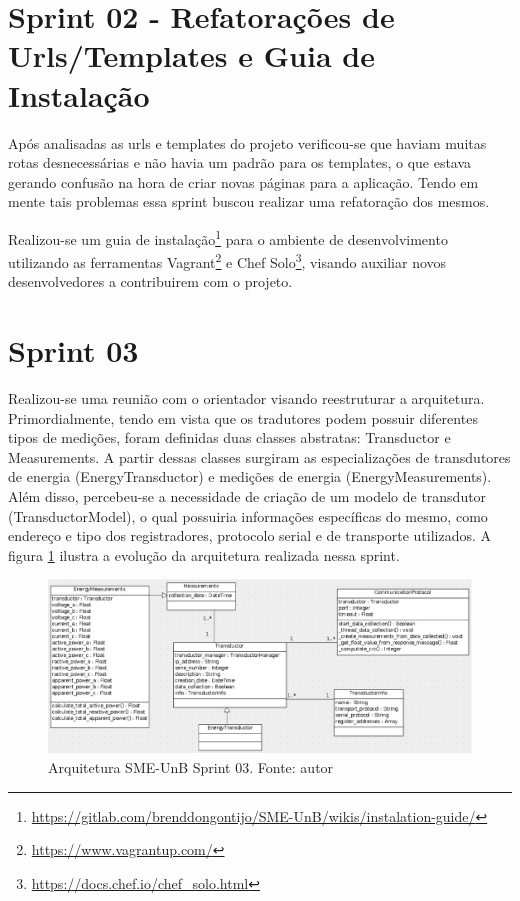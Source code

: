 \vfill
\pagebreak

\section{Sprint 02 - Refatorações de Urls/Templates e Guia de Instalação}
Após analisadas as urls e templates do projeto verificou-se que haviam muitas rotas desnecessárias e não havia um padrão para os templates, o que estava gerando confusão na hora de criar novas páginas para a aplicação. Tendo em mente tais problemas essa sprint buscou realizar uma refatoração dos mesmos.

Realizou-se um guia de instalação\footnote{\url{https://gitlab.com/brenddongontijo/SME-UnB/wikis/instalation-guide/}} para o ambiente de desenvolvimento utilizando as ferramentas Vagrant\footnote{\url{https://www.vagrantup.com/}} e Chef Solo\footnote{\url{https://docs.chef.io/chef_solo.html}}, visando auxiliar novos desenvolvedores a contribuirem com o projeto.

\section{Sprint 03}
Realizou-se uma reunião com o orientador visando reestruturar a arquitetura. Primordialmente, tendo em vista que os tradutores podem possuir diferentes tipos de medições, foram definidas duas classes abstratas: Transductor e Measurements. A partir dessas classes surgiram as especializações de transdutores de energia (EnergyTransductor) e medições de energia (EnergyMeasurements). Além disso, percebeu-se a necessidade de criação de um modelo de transdutor (TransductorModel), o qual possuiria informações específicas do mesmo, como endereço e tipo dos registradores, protocolo serial e de transporte utilizados. A figura \ref{sprint03arq} ilustra a evolução da arquitetura realizada nessa sprint.

\begin{figure}[!htpb]
    \centering
    \includegraphics[scale=0.6,angle=90]{figuras/sprint03arq.eps}
    \caption{Arquitetura SME-UnB Sprint 03. Fonte: autor}
    \label{sprint03arq}
\end{figure}

